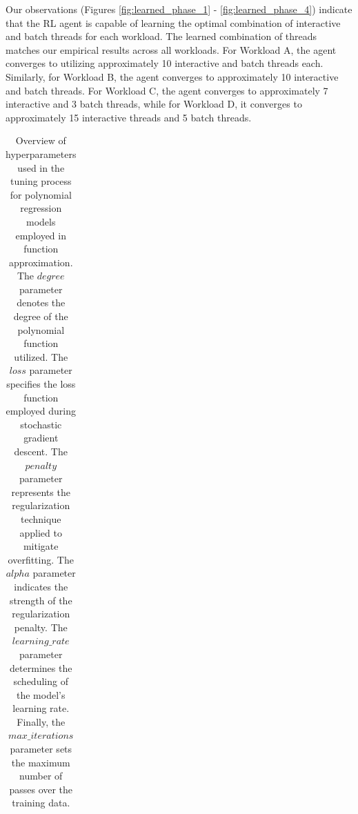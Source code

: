 Our observations (Figures \ref{fig:learned_phase_1} - \ref{fig:learned_phase_4}) indicate that the RL agent is capable of learning the optimal combination of interactive and batch threads for each workload. The learned combination of threads matches our empirical results across all workloads. For Workload A, the agent converges to utilizing approximately 10 interactive and batch threads each. Similarly, for Workload B, the agent converges to approximately 10 interactive and batch threads. For Workload C, the agent converges to approximately 7 interactive and 3 batch threads, while for Workload D, it converges to approximately 15 interactive threads and 5 batch threads.

\begin{table}[H]
  \centering
  \caption[Hyperparameter Tuning Options for Polynomial Regression Models]{Overview of hyperparameters used in the tuning process for polynomial regression models employed in function approximation. The $degree$ parameter denotes the degree of the polynomial function utilized. The $loss$ parameter specifies the loss function employed during stochastic gradient descent. The $penalty$ parameter represents the regularization technique applied to mitigate overfitting. The $alpha$ parameter indicates the strength of the regularization penalty. The $learning\_rate$ parameter determines the scheduling of the model's learning rate. Finally, the $max\_iterations$ parameter sets the maximum number of passes over the training data.}
  \label{table:hyperparameter_tuning}
  \begin{tabular}{|c|c|}
    \hline

\end{tabular}
\end{table}

